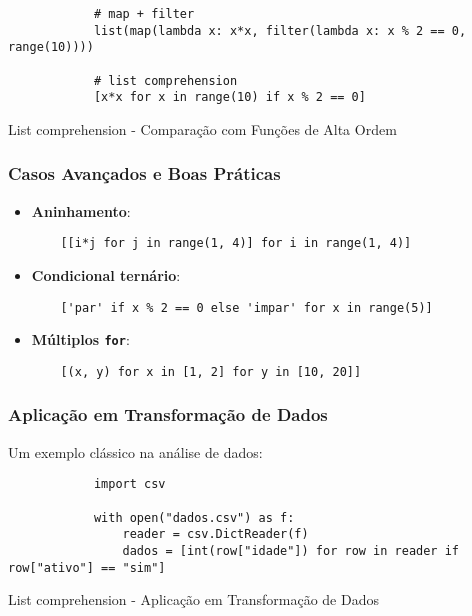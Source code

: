 \documentclass[date,twocolumn,a4paper]{ppgem}
\begin{document}
    \begin{listing}[!ht]
        \begin{verbatim}
            # map + filter
            list(map(lambda x: x*x, filter(lambda x: x % 2 == 0, range(10))))

            # list comprehension
            [x*x for x in range(10) if x % 2 == 0]
        \end{verbatim}
        \caption{List comprehension - Comparação com Funções de Alta Ordem}
        \label{listing:2}
    \end{listing}

    \subsubsection{Casos Avançados e Boas Práticas}
    \begin{itemize}
    \item \textbf{Aninhamento}:
    \begin{verbatim}
    [[i*j for j in range(1, 4)] for i in range(1, 4)]
    \end{verbatim}
    \item \textbf{Condicional ternário}:
    \begin{verbatim}
    ['par' if x % 2 == 0 else 'impar' for x in range(5)]
    \end{verbatim}
    \item \textbf{Múltiplos \texttt{for}}:
    \begin{verbatim}
    [(x, y) for x in [1, 2] for y in [10, 20]]
    \end{verbatim}
    \end{itemize}

    \subsubsection{Aplicação em Transformação de Dados}
    Um exemplo clássico na análise de dados:

    \begin{listing}[!ht]
        \begin{verbatim}
            import csv

            with open("dados.csv") as f:
                reader = csv.DictReader(f)
                dados = [int(row["idade"]) for row in reader if row["ativo"] == "sim"]
        \end{verbatim}
        \caption{List comprehension - Aplicação em Transformação de Dados}
        \label{listing:2}
    \end{listing}
\end{document}
